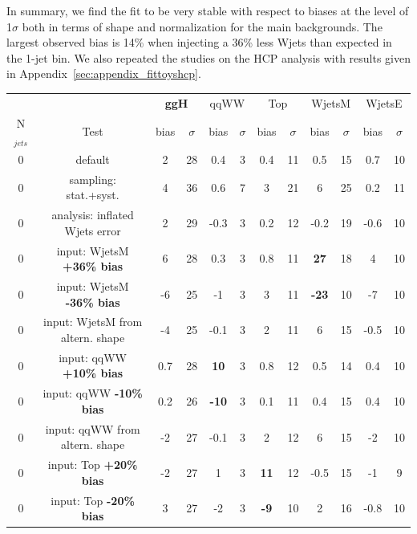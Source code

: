 In summary, we find the fit to be very stable with respect to biases at the level of 1$\sigma$ both in terms of shape and 
normalization for the main backgrounds. The largest observed bias is 14\% when injecting a 36\% less Wjets than expected 
in the 1-jet bin.
We also repeated the studies on the HCP analysis with results given in Appendix~\ref{sec:appendix_fittoyshcp}. 

\begin{table}
\begin{center}
\begin{tabular}{c | c  | c c | c c | c c | c c | c c }
\hline
          &      & \multicolumn{2}{c|}{{\bf ggH}} & \multicolumn{2}{c|}{qqWW} & \multicolumn{2}{c|}{Top} & \multicolumn{2}{c}{WjetsM} & \multicolumn{2}{c}{WjetsE} \\ 
N$_{jets}$ & Test & bias & $\sigma$ & bias & $\sigma$ & bias & $\sigma$ & bias & $\sigma$ & bias & $\sigma$ \\
\hline
0 & default                             &  2  & 28 & 0.4 & 3 & 0.4 & 11 & 0.5 & 15 & 0.7 & 10 \\
0 & sampling: stat.+syst.               &  4  & 36 & 0.6 & 7 &  3  & 21 &  6  & 25 & 0.2 & 11 \\
\hline
0 & analysis: inflated Wjets error      &  2  & 29 & -0.3 & 3 & 0.2 & 12 & -0.2      & 19 & -0.6 & 10 \\
0 & input: WjetsM {\bf +36\% bias}      &  6  & 28 & 0.3  & 3 & 0.8 & 11 & {\bf 27}  & 18 & 4    & 10 \\
0 & input: WjetsM {\bf -36\% bias}      & -6  & 25 & -1   & 3 & 3   & 11 & {\bf -23} & 10 & -7   & 10 \\
0 & input: WjetsM from altern. shape    & -4  & 25 & -0.1 & 3 & 2   & 11 & 6         & 15 & -0.5 & 10 \\
\hline
0 & input: qqWW {\bf +10\% bias}        & 0.7 & 28 & {\bf 10}  & 3 & 0.8 & 12 & 0.5 & 14 & 0.4 & 10 \\
0 & input: qqWW {\bf -10\% bias}        & 0.2 & 26 & {\bf -10} & 3 & 0.1 & 11 & 0.4 & 15 & 0.4 & 10 \\
0 & input: qqWW from altern. shape      & -2  & 27 & -0.1      & 3 & 2   & 12 & 6   & 15 & -2  & 10 \\
\hline
0 & input: Top {\bf +20\% bias}         & -2  & 27  & 1    & 3 & {\bf 11} & 12  & -0.5 & 15  & -1   & 9\\
0 & input: Top {\bf -20\% bias}         & 3   & 27  & -2   & 3 & {\bf -9} & 10  & 2    & 16  & -0.8 & 10\\

\end{tabular}
\end{center}
\end{table}

